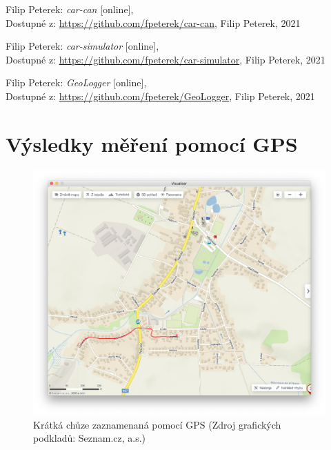 \documentclass[czech, bachelor]{diploma}
\begin{document}
\begin{thebibliography}{50}
Filip Peterek: \textit{car-can} [online], \\
Dostupné z:
\url{https://github.com/fpeterek/car-can},
Filip Peterek, 2021

Filip Peterek: \textit{car-simulator} [online], \\
Dostupné z:
\url{https://github.com/fpeterek/car-simulator},
Filip Peterek, 2021

Filip Peterek: \textit{GeoLogger} [online], \\
Dostupné z:
\url{https://github.com/fpeterek/GeoLogger},
Filip Peterek, 2021

\end{thebibliography}

\appendix

\chapter{Výsledky měření pomocí GPS} \label{gps-measuring-results-all}

\begin{figure}
    \centering
    \includegraphics[width=1\textwidth]{Figures/domzolsiny.png}
    \caption{Krátká chůze zaznamenaná pomocí GPS (Zdroj grafických podkladů: Seznam.cz, a.s.)}
    \label{fig:domzolsiny-fullsize}
\end{figure}
\end{document}
